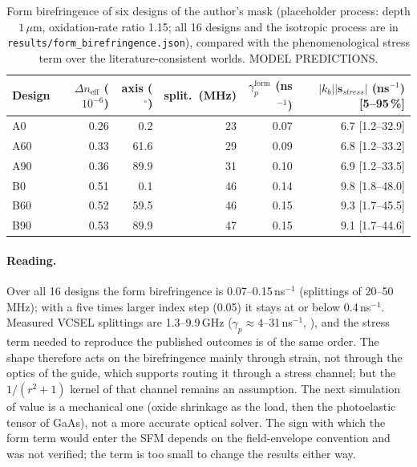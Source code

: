 \begin{table}[H]\centering\small
\begin{tabular}{lrrrrr}\toprule
Design & $\Delta n_{\mathrm{eff}}$ ($10^{-6}$) & axis ($^\circ$) & split.\ (MHz) & $\gamma_p^{\mathrm{form}}$ (ns$^{-1}$) & $|k_b||\mathbf s_{stress}|$ (ns$^{-1}$) [5--95\,\%]\\\midrule
A0 & 0.26 & 0.2 & 23 & 0.07 & 6.7 [1.2--32.9]\\
A60 & 0.33 & 61.6 & 29 & 0.09 & 6.8 [1.2--33.2]\\
A90 & 0.36 & 89.9 & 31 & 0.10 & 6.9 [1.2--33.5]\\
B0 & 0.51 & 0.1 & 46 & 0.14 & 9.8 [1.8--48.0]\\
B60 & 0.52 & 59.5 & 46 & 0.15 & 9.3 [1.7--45.5]\\
B90 & 0.53 & 89.9 & 47 & 0.15 & 9.1 [1.7--44.6]\\\bottomrule
\end{tabular}
\caption{Form birefringence of six designs of the author's mask (placeholder process: depth $1\,\mu$m, oxidation-rate ratio 1.15; all 16 designs and the isotropic process are in \texttt{results/form\_birefringence.json}), compared with the phenomenological stress term over the literature-consistent worlds. MODEL PREDICTIONS.}\label{tab:formbiref}\end{table}
\paragraph{Reading.} Over all 16 designs the form birefringence is 0.07--0.15\,ns$^{-1}$ (splittings of 20--50\,MHz); with a five times larger index step (0.05) it stays at or below 0.4\,ns$^{-1}$. Measured VCSEL splittings are 1.3--9.9\,GHz ($\gamma_p\approx4$--31\,ns$^{-1}$, \cite{choquette1995}), and the stress term needed to reproduce the published outcomes is of the same order. The shape therefore acts on the birefringence mainly through strain, not through the optics of the guide, which supports routing it through a stress channel; but the $1/(r^2+1)$ kernel of that channel remains an assumption. The next simulation of value is a mechanical one (oxide shrinkage as the load, then the photoelastic tensor of GaAs), not a more accurate optical solver. The sign with which the form term would enter the SFM depends on the field-envelope convention and was not verified; the term is too small to change the results either way.

